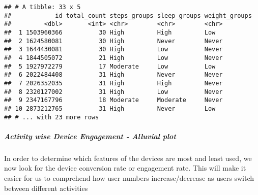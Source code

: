 \documentclass[
]{article}
\begin{document}
\begin{verbatim}
## # A tibble: 33 x 5
##            id total_count steps_groups sleep_groups weight_groups
##         <dbl>       <int> <chr>        <chr>        <chr>        
##  1 1503960366          30 High         High         Low          
##  2 1624580081          30 High         Never        Never        
##  3 1644430081          30 High         Low          Never        
##  4 1844505072          21 High         Low          Never        
##  5 1927972279          17 Moderate     Low          Low          
##  6 2022484408          31 High         Never        Never        
##  7 2026352035          31 High         High         Never        
##  8 2320127002          31 High         Low          Never        
##  9 2347167796          18 Moderate     Moderate     Never        
## 10 2873212765          31 High         Never        Low          
## # ... with 23 more rows
\end{verbatim}

\hypertarget{activity-wise-device-engagement---alluvial-plot}{%
\subparagraph{\texorpdfstring{\textbf{Activity wise Device Engagement -
Alluvial
plot}}{Activity wise Device Engagement - Alluvial plot}}\label{activity-wise-device-engagement---alluvial-plot}}

In order to determine which features of the devices are most and least
used, we now look for the device conversion rate or engagement rate.
This will make it easier for us to comprehend how user numbers
increase/decrease as users switch between different activities
\end{document}
